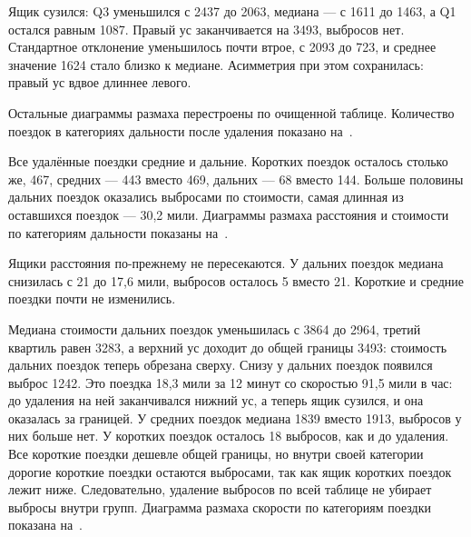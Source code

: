 \documentclass[a4paper,14pt]{extarticle}
\begin{document}


Ящик сузился: Q3 уменьшился с 2437 до 2063, медиана — с 1611 до 1463, а Q1 остался равным 1087. Правый ус заканчивается на 3493, выбросов нет. Стандартное отклонение уменьшилось почти втрое, с 2093 до 723, и среднее значение 1624 стало близко к медиане. Асимметрия при этом сохранилась: правый ус вдвое длиннее левого.

Остальные диаграммы размаха перестроены по очищенной таблице. Количество поездок в категориях дальности после удаления показано на~.


Все удалённые поездки средние и дальние. Коротких поездок осталось столько же, 467, средних — 443 вместо 469, дальних — 68 вместо 144. Больше половины дальних поездок оказались выбросами по стоимости, самая длинная из оставшихся поездок — 30,2 мили. Диаграммы размаха расстояния и стоимости по категориям дальности показаны на~.


Ящики расстояния по-прежнему не пересекаются. У дальних поездок медиана снизилась с 21 до 17,6 мили, выбросов осталось 5 вместо 21. Короткие и средние поездки почти не изменились.

Медиана стоимости дальних поездок уменьшилась с 3864 до 2964, третий квартиль равен 3283, а верхний ус доходит до общей границы 3493: стоимость дальних поездок теперь обрезана сверху. Снизу у дальних поездок появился выброс 1242. Это поездка 18,3 мили за 12 минут со скоростью 91,5 мили в час: до удаления на ней заканчивался нижний ус, а теперь ящик сузился, и она оказалась за границей. У средних поездок медиана 1839 вместо 1913, выбросов у них больше нет. У коротких поездок осталось 18 выбросов, как и до удаления. Все короткие поездки дешевле общей границы, но внутри своей категории дорогие короткие поездки остаются выбросами, так как ящик коротких поездок лежит ниже. Следовательно, удаление выбросов по всей таблице не убирает выбросы внутри групп. Диаграмма размаха скорости по категориям поездки показана на~.
\end{document}

